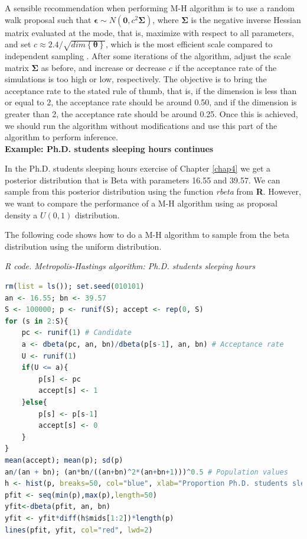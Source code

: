 A sensible recommendation when performing M-H algorithm is to use a random walk proposal such that $\bm{\epsilon}\sim N(\bm{0},c^2\bm{\Sigma})$, where $\bm{\Sigma}$ is the negative inverse Hessian matrix evaluated at the mode, that is, maximize with respect to all parameters, and set $c\approx 2.4/\sqrt{dim\left\{\bm{\theta}\right\}}$, which is the most efficient scale compared to independent sampling \cite[Chap.~12]{gelman2021bayesian}. After some iterations of the algorithm, adjust the scale matrix $\bm{\Sigma}$ as before, and increase or decrease $c$ if the acceptance rate of the simulations is too high or low, respectively. The objective is to bring the acceptance rate to the stated rule of thumb, that is, if the dimension is less than or equal to 2, the acceptance rate should be around 0.50, and if the dimension is greater than 2, the acceptance rate should be around 0.25. Once this is achieved, we should run the algorithm without modifications and use this part of the algorithm to perform inference.\\


\textbf{Example: Ph.D. students sleeping hours continues}

In the Ph.D. students sleeping hours exercise of Chapter \ref{chap4} we get a posterior distribution that is Beta with parameters 16.55 and 39.57. We can sample from this posterior distribution using the function \textit{rbeta} from \textbf{R}. However, we want to compare the performance of a M-H algorithm using as proposal density a $U(0,1)$ distribution.

The following code shows how to do a M-H algorithm to sample from the beta distribution using the uniform distribution.

\begin{tcolorbox}[enhanced,width=4.67in,center upper,
	fontupper=\large\bfseries,drop shadow southwest,sharp corners]
	\textit{R code. Metropolis-Hastings algorithm:  Ph.D. students sleeping hours}
	\begin{VF}
		\begin{lstlisting}[language=R]
rm(list = ls()); set.seed(010101)
an <- 16.55; bn <- 39.57
S <- 100000; p <- runif(S); accept <- rep(0, S)
for (s in 2:S){
	pc <- runif(1) # Candidate
	a <- dbeta(pc, an, bn)/dbeta(p[s-1], an, bn) # Acceptance rate
	U <- runif(1)
	if(U <= a){
		p[s] <- pc
		accept[s] <- 1
	}else{
		p[s] <- p[s-1]
		accept[s] <- 0
	}
}
mean(accept); mean(p); sd(p)
an/(an + bn); (an*bn/((an+bn)^2*(an+bn+1)))^0.5 # Population values
h <- hist(p, breaks=50, col="blue", xlab="Proportion Ph.D. students sleeping at least 6 hours", main="Beta draws from a Metropolis-Hastings algorithm")
pfit <- seq(min(p),max(p),length=50)
yfit<-dbeta(pfit, an, bn)
yfit <- yfit*diff(h$mids[1:2])*length(p)
lines(pfit, yfit, col="red", lwd=2)
\end{lstlisting}
	\end{VF}
\end{tcolorbox} 

